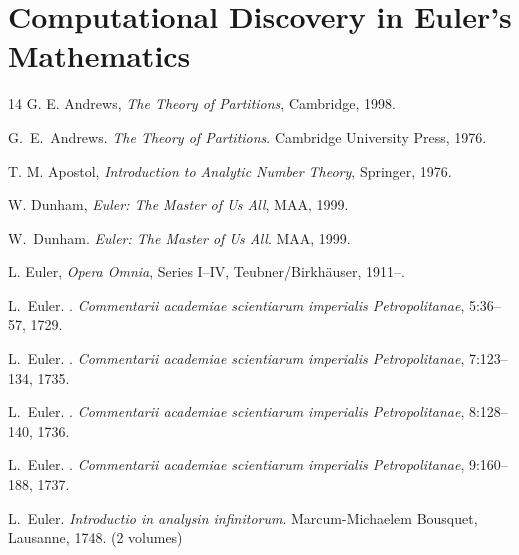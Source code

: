 \documentclass[11pt,a4paper,twoside]{book}
\theoremstyle{eulerstyle}
\theoremstyle{definition}
\begin{document}
\cleardoublepage

\part{Computational Discovery in Euler's Mathematics}
\label{part:computational_discovery}


\cleardoublepage

\cleardoublepage


\begin{thebibliography}{14}
G. E. Andrews, \textit{The Theory of Partitions}, Cambridge, 1998.

G.~E.~Andrews.
\newblock \emph{The Theory of Partitions}.
\newblock Cambridge University Press, 1976.

T. M. Apostol, \textit{Introduction to Analytic Number Theory}, Springer, 1976.

W. Dunham, \textit{Euler: The Master of Us All}, MAA, 1999.

W.~Dunham.
\newblock \emph{Euler: The Master of Us All}.
\newblock MAA, 1999.

L. Euler, \textit{Opera Omnia}, Series I--IV, Teubner/Birkh\"auser, 1911--.

L.~Euler.
.
\newblock \emph{Commentarii academiae scientiarum imperialis Petropolitanae}, 5:36--57, 1729.

L.~Euler.
.
\newblock \emph{Commentarii academiae scientiarum imperialis Petropolitanae}, 7:123--134, 1735.

L.~Euler.
.
\newblock \emph{Commentarii academiae scientiarum imperialis Petropolitanae}, 8:128--140, 1736.

L.~Euler.
.
\newblock \emph{Commentarii academiae scientiarum imperialis Petropolitanae}, 9:160--188, 1737.

L.~Euler.
\newblock \emph{Introductio in analysin infinitorum}.
\newblock Marcum-Michaelem Bousquet, Lausanne, 1748. (2 volumes)


\end{thebibliography}
\end{document}
